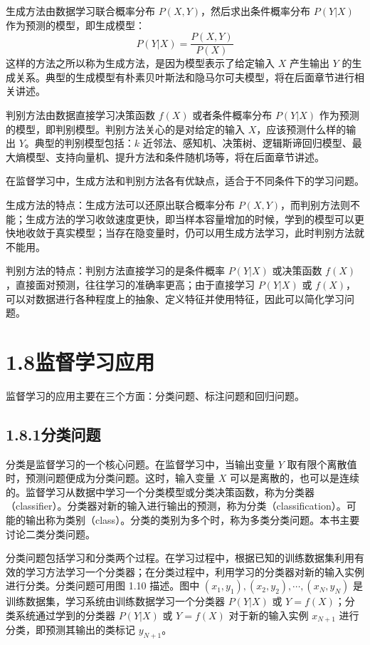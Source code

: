 \documentclass[UTF8, 12pt, fontset=fandol, oneside]{ctexart}
\begin{document}
生成方法由数据学习联合概率分布 $P(X,Y)$，然后求出条件概率分布 $P(Y|X)$ 作为预测的模型，即生成模型：
\begin{equation}
  P(Y|X)=\frac{P(X,Y)}{P(X)}
  \tag{1.40}
\end{equation}
这样的方法之所以称为生成方法，是因为模型表示了给定输入 $X$ 产生输出 $Y$ 的生成关系。典型的生成模型有朴素贝叶斯法和隐马尔可夫模型，将在后面章节进行相关讲述。

判别方法由数据直接学习决策函数 $f(X)$ 或者条件概率分布 $P(Y|X)$ 作为预测的模型，即判别模型。判别方法关心的是对给定的输入 $X$，应该预测什么样的输出 $Y$。典型的判别模型包括：$k$ 近邻法、感知机、决策树、逻辑斯谛回归模型、最大熵模型、支持向量机、提升方法和条件随机场等，将在后面章节讲述。

在监督学习中，生成方法和判别方法各有优缺点，适合于不同条件下的学习问题。

生成方法的特点：生成方法可以还原出联合概率分布 $P(X,Y)$，而判别方法则不能；生成方法的学习收敛速度更快，即当样本容量增加的时候，学到的模型可以更快地收敛于真实模型；当存在隐变量时，仍可以用生成方法学习，此时判别方法就不能用。

判别方法的特点：判别方法直接学习的是条件概率 $P(Y|X)$ 或决策函数 $f(X)$，直接面对预测，往往学习的准确率更高；由于直接学习 $P(Y|X)$ 或 $f(X)$，可以对数据进行各种程度上的抽象、定义特征并使用特征，因此可以简化学习问题。

\section*{1.8\quad 监督学习应用}

监督学习的应用主要在三个方面：分类问题、标注问题和回归问题。

\subsection*{1.8.1\quad 分类问题}

分类是监督学习的一个核心问题。在监督学习中，当输出变量 $Y$ 取有限个离散值时，预测问题便成为分类问题。这时，输入变量 $X$ 可以是离散的，也可以是连续的。监督学习从数据中学习一个分类模型或分类决策函数，称为分类器（classifier）。分类器对新的输入进行输出的预测，称为分类（classification）。可能的输出称为类别（class）。分类的类别为多个时，称为多类分类问题。本书主要讨论二类分类问题。

分类问题包括学习和分类两个过程。在学习过程中，根据已知的训练数据集利用有效的学习方法学习一个分类器；在分类过程中，利用学习的分类器对新的输入实例进行分类。分类问题可用图 1.10 描述。图中 $(x_1,y_1),(x_2,y_2),\cdots,(x_N,y_N)$ 是训练数据集，学习系统由训练数据学习一个分类器 $P(Y|X)$ 或 $Y=f(X)$；分类系统通过学到的分类器 $P(Y|X)$ 或 $Y=f(X)$ 对于新的输入实例 $x_{N+1}$ 进行分类，即预测其输出的类标记 $y_{N+1}$。
\end{document}
